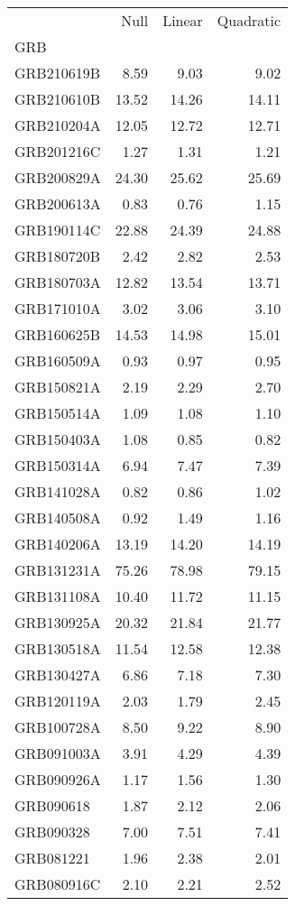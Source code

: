 \begin{tabular}{lrrr}
\toprule
 & Null & Linear & Quadratic \\
GRB &  &  &  \\
\midrule
GRB210619B & 8.59 & 9.03 & 9.02 \\
GRB210610B & 13.52 & 14.26 & 14.11 \\
GRB210204A & 12.05 & 12.72 & 12.71 \\
GRB201216C & 1.27 & 1.31 & 1.21 \\
GRB200829A & 24.30 & 25.62 & 25.69 \\
GRB200613A & 0.83 & 0.76 & 1.15 \\
GRB190114C & 22.88 & 24.39 & 24.88 \\
GRB180720B & 2.42 & 2.82 & 2.53 \\
GRB180703A & 12.82 & 13.54 & 13.71 \\
GRB171010A & 3.02 & 3.06 & 3.10 \\
GRB160625B & 14.53 & 14.98 & 15.01 \\
GRB160509A & 0.93 & 0.97 & 0.95 \\
GRB150821A & 2.19 & 2.29 & 2.70 \\
GRB150514A & 1.09 & 1.08 & 1.10 \\
GRB150403A & 1.08 & 0.85 & 0.82 \\
GRB150314A & 6.94 & 7.47 & 7.39 \\
GRB141028A & 0.82 & 0.86 & 1.02 \\
GRB140508A & 0.92 & 1.49 & 1.16 \\
GRB140206A & 13.19 & 14.20 & 14.19 \\
GRB131231A & 75.26 & 78.98 & 79.15 \\
GRB131108A & 10.40 & 11.72 & 11.15 \\
GRB130925A & 20.32 & 21.84 & 21.77 \\
GRB130518A & 11.54 & 12.58 & 12.38 \\
GRB130427A & 6.86 & 7.18 & 7.30 \\
GRB120119A & 2.03 & 1.79 & 2.45 \\
GRB100728A & 8.50 & 9.22 & 8.90 \\
GRB091003A & 3.91 & 4.29 & 4.39 \\
GRB090926A & 1.17 & 1.56 & 1.30 \\
GRB090618 & 1.87 & 2.12 & 2.06 \\
GRB090328 & 7.00 & 7.51 & 7.41 \\
GRB081221 & 1.96 & 2.38 & 2.01 \\
GRB080916C & 2.10 & 2.21 & 2.52 \\
\bottomrule
\end{tabular}
